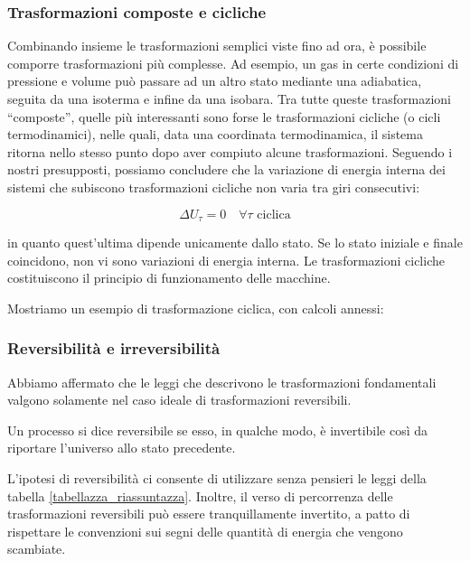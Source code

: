 \subsubsection*{Trasformazioni composte e cicliche}
Combinando insieme le trasformazioni semplici viste fino ad ora, è possibile
comporre trasformazioni più complesse. Ad esempio, un gas in certe
condizioni di pressione e volume può passare ad un altro stato mediante
una adiabatica, seguita da una isoterma e infine da una isobara. %
Tra tutte queste trasformazioni ``composte'', quelle più interessanti
sono forse le trasformazioni cicliche (o cicli termodinamici), nelle
quali, data una coordinata termodinamica, il sistema ritorna nello stesso
punto dopo aver compiuto alcune trasformazioni. Seguendo i nostri presupposti,
possiamo concludere che la variazione di energia interna dei sistemi che
subiscono trasformazioni cicliche non varia tra giri consecutivi:

\[ \Delta U_\tau = 0 \quad \forall \tau \text{ ciclica} \]

\noindent in quanto quest'ultima dipende unicamente dallo stato. Se
lo stato iniziale e finale coincidono, non vi sono variazioni di energia
interna.
Le trasformazioni cicliche costituiscono il principio di funzionamento delle macchine.

Mostriamo un esempio di trasformazione ciclica, con calcoli
annessi:


\subsubsection*{Reversibilità e irreversibilità}
Abbiamo affermato che le leggi che descrivono le trasformazioni fondamentali
valgono solamente nel caso ideale di trasformazioni reversibili.

\begin{tcolorbox}[colback = yellow!30, colframe = yellow!30!black, title = {Trasformazioni reversibili}]
    Un processo si dice reversibile se esso, in qualche modo, è
    invertibile così da riportare l'universo allo stato
    precedente.
\end{tcolorbox}

\noindent L'ipotesi di reversibilità ci consente di utilizzare senza
pensieri le leggi della tabella \ref{tabellazza_riassuntazza}. Inoltre,
il verso di percorrenza delle trasformazioni reversibili può essere
tranquillamente invertito, a patto di rispettare le convenzioni sui
segni delle quantità di energia che vengono scambiate.

